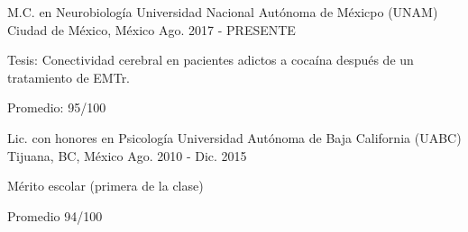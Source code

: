\begin{cventries}
    \cventry
        {M.C. en Neurobiología}
        {Universidad Nacional Autónoma de Méxicpo (UNAM)}
        {Ciudad de México, México}
        {Ago. 2017 - PRESENTE}
        {
            \begin{cvitems}
            \item {Tesis: Conectividad cerebral en pacientes adictos a cocaína después de un tratamiento de EMTr.}
                \item {Promedio: 95/100}
            \end{cvitems}
        }
    \cventry
        {Lic. con honores en Psicología}
        {Universidad Autónoma de Baja California (UABC)}
        {Tijuana, BC, México}
        {Ago. 2010 - Dic. 2015}
        {
            \begin{cvitems}
                \item {Mérito escolar (primera de la clase)}
                \item {Promedio 94/100}
            \end{cvitems}
        }
\end{cventries}
